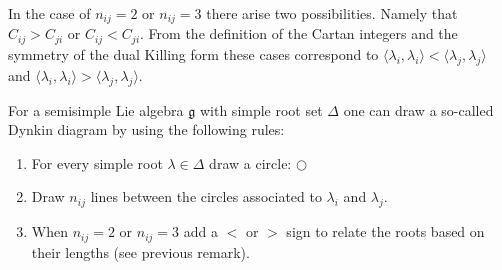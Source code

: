         \begin{remark}
        	In the case of $n_{ij} = 2$ or $n_{ij} = 3$ there arise two possibilities. Namely that $C_{ij}>C_{ji}$ or $C_{ij}<C_{ji}$. From the definition of the Cartan integers and the symmetry of the dual Killing form these cases correspond to $\langle\lambda_i, \lambda_i\rangle<\langle\lambda_j, \lambda_j\rangle$ and $\langle\lambda_i, \lambda_i\rangle>\langle\lambda_j, \lambda_j\rangle$.
        \end{remark}
        
        \begin{construct}\label{lie:construct_dynkin}
        	For a semisimple Lie algebra $\mathfrak{g}$ with simple root set $\Delta$ one can draw a so-called Dynkin diagram by using the following rules:
        	\begin{enumerate}
        		\item For every simple root $\lambda\in\Delta$ draw a circle: $\bigcirc$
        		\item Draw $n_{ij}$ lines between the circles associated to $\lambda_i$ and $\lambda_j$.
        		\item When $n_{ij} = 2$ or $n_{ij} = 3$ add a $<$ or $>$ sign to relate the roots based on their lengths (see previous remark).
        	\end{enumerate}
        \end{construct}
        
